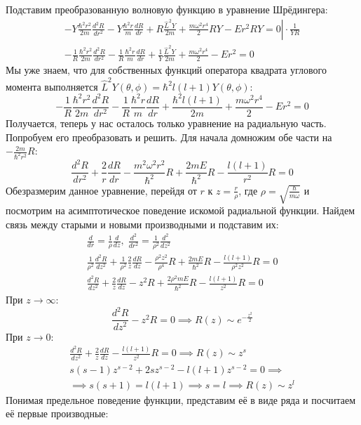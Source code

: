Подставим преобразованную волновую функцию в уравнение Шрёдингера:
\begin{gather*}
    \left. -Y\frac{\hbar^2 r^2}{2m}\frac{d^2R}{dr^2} - Y\frac{\hbar^2 r}{m}\frac{dR}{dr} + R\frac{\hat{L}^2Y}{2m} + \frac{m\omega^2r^4}{2}RY - Er^2RY = 0 \right| \cdot \frac{1}{YR} \\
    -\frac{1}{R}\frac{\hbar^2 r^2}{2m}\frac{d^2R}{dr^2} - \frac{1}{R}\frac{\hbar^2r}{m}\frac{dR}{dr} + \frac{1}{Y}\frac{\hat{L}^2Y}{2m} + \frac{m\omega^2r^4}{2} - Er^2 = 0
\end{gather*}
Мы уже знаем, что для собственных функций оператора квадрата углового момента выполняется $\hat{L}^2Y(\theta, \phi) = \hbar^2l(l+1)Y(\theta, \phi)$:
\[
-\frac{1}{R}\frac{\hbar^2 r^2}{2m}\frac{d^2R}{dr^2} - \frac{1}{R}\frac{\hbar^2r}{m}\frac{dR}{dr} + \frac{\hbar^2 l(l+1)}{2m} + \frac{m\omega^2r^4}{2} - Er^2 = 0
\]
Получается, теперь у нас осталось только уравнение на радиальную часть. Попробуем его преобразовать и решить. Для начала домножим обе части на $-\frac{2m}{\hbar^2r^2}R$:
\[
\frac{d^2R}{dr^2} + \frac{2}{r}\frac{dR}{dr} - \frac{m^2\omega^2r^2}{\hbar^2}R + \frac{2mE}{\hbar^2}R - \frac{l(l+1)}{r^2}R = 0
\]
Обезразмерим данное уравнение, перейдя от $r$ к $z = \frac{r}{\rho}$, где $\rho = \sqrt{\frac{\hbar}{m\omega}}$ и посмотрим на асимптотическое поведение искомой радиальной функции. Найдем связь между старыми и новыми производными и подставим их:
\begin{gather*}
    \frac{d}{dr} = \frac{1}{\rho}\frac{d}{dz}, \; \frac{d^2}{dr^2} = \frac{1}{\rho^2}\frac{d^2}{dz^2} \\
    \frac{1}{\rho^2}\frac{d^2R}{dz^2} + \frac{1}{\rho^2}\frac{2}{z}\frac{dR}{dz} - \frac{\rho^2 z^2}{\rho^4}R + \frac{2mE}{\hbar^2}R - \frac{l(l+1)}{\rho^2z^2}R = 0 \\
    \frac{d^2R}{dz^2} + \frac{2}{z}\frac{dR}{dz} - z^2R + \frac{2\rho^2mE}{\hbar^2}R - \frac{l(l+1)}{z^2}R = 0
\end{gather*}
При $z \to \infty$:
\[
\frac{d^2R}{dz^2} - z^2R = 0 \implies R(z) \sim e^{-\frac{z^2}{2}}
\]
При $z \to 0$:
\begin{gather*}
    \frac{d^2R}{dz^2} + \frac{2}{z}\frac{dR}{dz} - \frac{l(l+1)}{z^2}R = 0 \implies R(z) \sim z^s \\
    s(s-1)z^{s-2} + 2sz^{s-2} - l(l+1)z^{s-2} = 0 \implies \\
    \implies s(s+1) = l(l+1) \implies s = l \implies R(z) \sim z^l
\end{gather*}
Понимая предельное поведение функции, представим её в виде ряда и посчитаем её первые производные:
